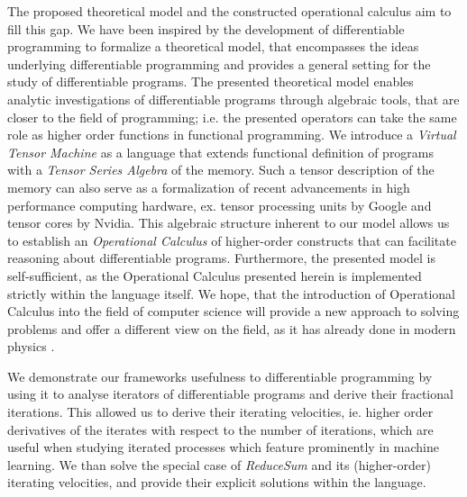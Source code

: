 The proposed theoretical model and the constructed operational calculus aim to
fill this gap. We have been inspired by the development of differentiable programming to
formalize a theoretical model, that encompasses the ideas underlying
differentiable programming and provides a general setting for the study of
differentiable programs. The presented theoretical model enables analytic
investigations of differentiable programs through algebraic tools, that are
closer to the field of programming; i.e. the presented operators can take the
same role as higher order functions in functional programming. We introduce a
\emph{Virtual Tensor Machine} as a language that extends functional definition
of programs with a \emph{Tensor Series Algebra} of the memory. Such a tensor
description of the memory can also serve as a formalization of recent
advancements in high performance computing hardware, ex. tensor processing
units by Google and tensor cores by Nvidia. This algebraic structure inherent
to our model allows us to establish an \emph{Operational Calculus} of
higher-order constructs that can facilitate reasoning about differentiable
programs. Furthermore, the presented model is self-sufficient, as the
Operational Calculus presented herein is implemented strictly within the
language itself. We hope, that the introduction of Operational Calculus into the
field of computer science will provide a new approach to solving problems and offer
a different view on the field, as it has already done in modern physics \cite{OpCalc}.

We demonstrate our frameworks usefulness to differentiable programming by using it to
analyse iterators of differentiable programs and derive their fractional iterations.
This allowed us to derive their iterating velocities, ie. higher order derivatives of
the iterates with respect to the number of iterations, which are useful when studying
iterated processes which feature prominently in machine learning. We than solve the
special case of \emph{ReduceSum} and its (higher-order) iterating velocities, and
provide their explicit solutions within the language.

